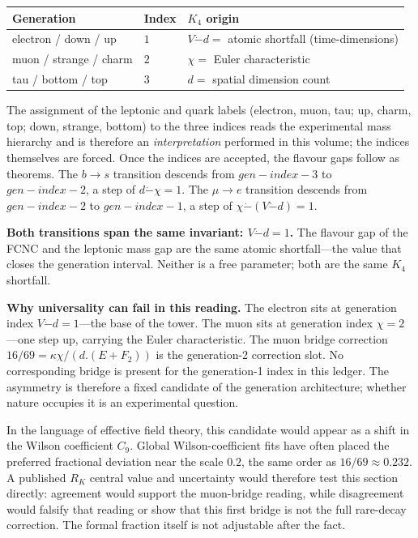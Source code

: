 \documentclass[11pt,a4paper]{book}
\def\cdot{.}%
\def\text#1{#1}%
\begin{document}
\begin{center}
\begin{tabular}{lll}
\toprule
Generation & Index & $K_4$ origin \\
\midrule
electron / down / up & $1$ & $V \dot{-} d = $ atomic shortfall (time-dimensions) \\
muon / strange / charm & $2$ & $\chi = $ Euler characteristic \\
tau / bottom / top & $3$ & $d = $ spatial dimension count \\
\bottomrule
\end{tabular}
\end{center}

The assignment of the leptonic and quark labels (electron, muon, tau; up, charm, top; down, strange, bottom) to the three indices reads the experimental mass hierarchy and is therefore an \emph{interpretation} performed in this volume; the indices themselves are forced. Once the indices are accepted, the flavour gaps follow as theorems. The $b \to s$ transition descends from $\mathit{gen\text{-}index\text{-}3}$ to $\mathit{gen\text{-}index\text{-}2}$, a step of $d \dot{-} \chi = 1$. The $\mu \to e$ transition descends from $\mathit{gen\text{-}index\text{-}2}$ to $\mathit{gen\text{-}index\text{-}1}$, a step of $\chi \dot{-} (V \dot{-} d) = 1$.

\textbf{Both transitions span the same invariant: $V \dot{-} d = 1$.} The flavour gap of the FCNC and the leptonic mass gap are the same atomic shortfall---the value that closes the generation interval. Neither is a free parameter; both are the same $K_4$ shortfall.

\textbf{Why universality can fail in this reading.} The electron sits at generation index $V \dot{-} d = 1$---the base of the tower. The muon sits at generation index $\chi = 2$---one step up, carrying the Euler characteristic. The muon bridge correction $16/69 = \kappa\chi / (d \cdot (E + F_2))$ is the generation-2 correction slot. No corresponding bridge is present for the generation-1 index in this ledger. The asymmetry is therefore a fixed candidate of the generation architecture; whether nature occupies it is an experimental question.

In the language of effective field theory, this candidate would appear as a shift in the Wilson coefficient $C_9$. Global Wilson-coefficient fits have often placed the preferred fractional deviation near the scale $0.2$, the same order as $16/69 \approx 0.232$. A published $R_K$ central value and uncertainty would therefore test this section directly: agreement would support the muon-bridge reading, while disagreement would falsify that reading or show that this first bridge is not the full rare-decay correction. The formal fraction itself is not adjustable after the fact.
\end{document}

